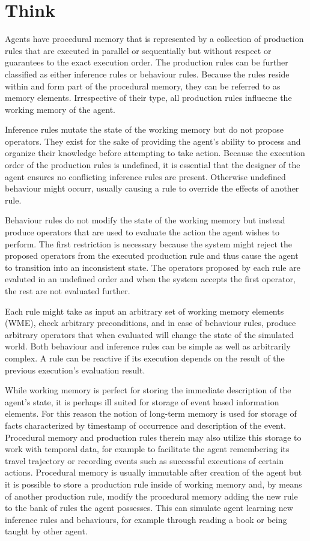 \section{Think}

Agents have procedural memory that is represented by a collection of production rules that are executed in parallel or sequentially but without respect or guarantees to the exact execution order.
The production rules can be further classified as either inference rules or behaviour rules.
Because the rules reside within and form part of the procedural memory, they can be referred to as memory elements.
Irrespective of their type, all production rules influecne the working memory of the agent.

Inference rules mutate the state of the working memory but do not propose operators.
They exist for the sake of providing the agent's ability to process and organize their knowledge before attempting to take action.
Because the execution order of the production rules is undefined, it is essential that the designer of the agent ensures no conflicting inference rules are present.
Otherwise undefined behaviour might occurr, usually causing a rule to override the effects of another rule.

Behaviour rules do not modify the state of the working memory but instead produce operators that are used to evaluate the action the agent wishes to perform.
The first restriction is necessary because the system might reject the proposed operators from the executed production rule and thus cause the agent to transition into an inconsistent state.
The operators proposed by each rule are evaluted in an undefined order and when the system accepts the first operator, the rest are not evaluated further.

Each rule might take as input an arbitrary set of working memory elements (WME), check arbitrary preconditions, and in case of behaviour rules, produce arbitrary operators that when evaluated will change the state of the simulated world.
Both behaviour and inference rules can be simple as well as arbitrarily complex.
A rule can be reactive if its execution depends on the result of the previous execution's evaluation result.

While working memory is perfect for storing the immediate description of the agent's state, it is perhaps ill suited for storage of event based information elements.
For this reason the notion of long-term memory is used for storage of facts characterized by timestamp of occurrence and description of the event.
Procedural memory and production rules therein may also utilize this storage to work with temporal data, for example to facilitate the agent remembering its travel trajectory or recording events such as successful executions of certain actions.
Procedural memory is usually immutable after creation of the agent but it is possible to store a production rule inside of working memory and, by means of another production rule, modify the procedural memory adding the new rule to the bank of rules the agent possesses.
This can simulate agent learning new inference rules and behaviours, for example through reading a book or being taught by other agent.


